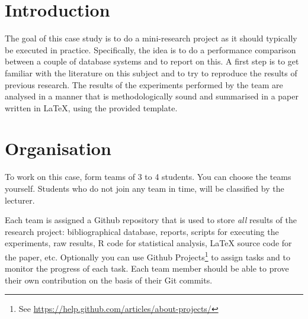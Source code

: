 \documentclass[fleqn,10pt]{artikeltin}
\affiliation{\textbf{Contact:}
    \textsuperscript{1} \href{mailto:wim.goedertier@hogent.be}{wim.goedertier@hogent.be};
    \textsuperscript{2} \href{mailto:jens.buysse@hogent.be}{jens.buysse@hogent.be};
    \textsuperscript{3} \href{mailto:bert.vanvreckem@hogent.be}{bert.vanvreckem@hogent.be};
    \textsuperscript{4} \href{mailto:wim.debruyn@hogent.be}{wim.debruyn@hogent.be}}
\begin{document}
\maketitle %
\tableofcontents %
\thispagestyle{empty} %


\section{Introduction} %
\label{sec:introduction}

The goal of this case study is to do a mini-research project as it should typically be executed in practice. Specifically, the idea is to do a performance comparison between a couple of database systems and to report on this. A first step is to get familiar with the literature on this subject and to try to reproduce the results of previous research. The results of the experiments performed by the team are analysed in a manner that is methodologically sound and summarised in a paper written in {\LaTeX}, using the provided template.

\section{Organisation}
\label{sec:organisation}

To work on this case, form teams of 3 to 4 students. You can choose the teams yourself. Students who do not join any team in time, will be classified by the lecturer.

Each team is assigned a Github repository that is used to store \emph{all} results of the research project: bibliographical database, reports, scripts for executing the experiments, raw results, R code for statistical analysis, {\LaTeX} source code for the paper, etc. Optionally you can use Github Projects\footnote{See \url{https://help.github.com/articles/about-projects/}} to assign tasks and to monitor the progress of each task. Each team member should be able to prove their own contribution on the basis of their Git commits.
\end{document}
